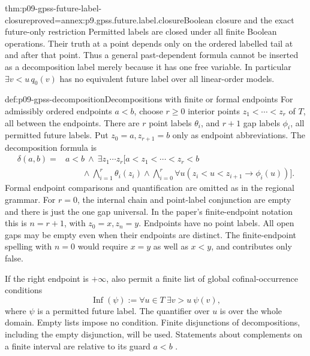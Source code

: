 \begin{hblemma}{thm:p09-gpss-future-label-closure}{proved=annex:p9.gpss.future.label.closure}{Boolean closure and the exact future-only restriction}
Permitted labels are closed under all finite Boolean operations.
Their truth at a point depends only on the ordered labelled tail
at and after that point. Thus a general past-dependent formula
cannot be inserted as a decomposition label merely because it has
one free variable. In particular \(\exists v<u\,q_0(v)\)
has no equivalent future label over all linear-order models.
\end{hblemma}

\begin{hbdefinition}{def:p09-gpss-decomposition}{Decompositions with finite or formal endpoints}
For admissibly ordered endpoints \(a<b\), choose \(r\geq0\)
interior points \(z_1<\cdots<z_r\) of \(T\), all between the
endpoints. There are \(r\) point labels \(\theta_i\), and
\(r+1\) gap labels \(\phi_i\), all permitted future labels.
Put \(z_0=a,z_{r+1}=b\) only as endpoint abbreviations. The
decomposition formula is
\[
\begin{aligned}
 \delta(a,b)={}&a<b\ \land\
 \exists z_1\cdots z_r\bigl[
       a<z_1<\cdots<z_r<b\\
 &\qquad\land\bigwedge_{i=1}^{r}\theta_i(z_i)
 \land\bigwedge_{i=0}^{r}
       \forall u(z_i<u<z_{i+1}\to\phi_i(u))\bigr].
\end{aligned}
\]
Formal endpoint comparisons and quantification are omitted as in the
regional grammar. For \(r=0\), the internal chain and point-label
conjunction are empty and there is just the one gap universal.
In the paper's finite-endpoint notation this is \(n=r+1\),
with \(z_0=x,z_n=y\). Endpoints have no point labels. All
open gaps may be empty even when their endpoints are distinct.
The finite-endpoint spelling with \(n=0\) would require
\(x=y\) as well as \(x<y\), and contributes only false.

If the right endpoint is \(+\infty\), also permit a finite
list of global cofinal-occurrence conditions
\[
          \operatorname{Inf}(\psi)
             :=\forall u\in T\ \exists v>u\ \psi(v),
\]
where \(\psi\) is a permitted future label. The quantifier
over \(u\) is over the whole domain. Empty lists impose no
condition. Finite disjunctions of decompositions, including the
empty disjunction, will be used. Statements about complements on
a finite interval are relative to its guard \(a<b\)
\cite[pp.~170--171]{GabbayPnueliShelahStavi1980}.
\end{hbdefinition}

